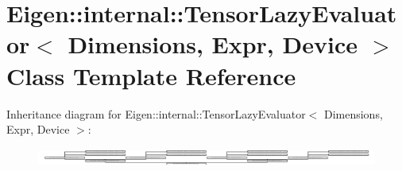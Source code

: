 \hypertarget{class_eigen_1_1internal_1_1_tensor_lazy_evaluator}{}\section{Eigen\+:\+:internal\+:\+:Tensor\+Lazy\+Evaluator$<$ Dimensions, Expr, Device $>$ Class Template Reference}
\label{class_eigen_1_1internal_1_1_tensor_lazy_evaluator}
Inheritance diagram for Eigen\+:\+:internal\+:\+:Tensor\+Lazy\+Evaluator$<$ Dimensions, Expr, Device $>$\+:\begin{figure}[H]
\begin{center}
\leavevmode
\includegraphics[height=0.597270cm]{class_eigen_1_1internal_1_1_tensor_lazy_evaluator}
\end{center}
\end{figure}
